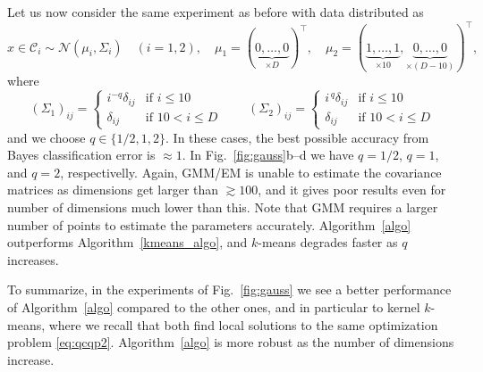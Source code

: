 \documentclass[aps,preprint,nofootinbib,floatfix]{revtex4-1}
\newcommand\C{{\mathcal{C}}}
\begin{document}
Let us now consider the same experiment as before with data distributed as
\begin{equation}
\label{eq:gauss2}
x \in \C_i  \sim 
\mathcal{N}(\mu_i,\Sigma_i) \quad (i=1,2),  \quad
\mu_1 = (\underbrace{0,\dotsc,0}_{\times D})^\top , \quad
\mu_2 = (\underbrace{1,\dots,1}_{\times 10},
\underbrace{0,\dots,0}_{\times (D-10)})^\top, 
\end{equation}
where
\begin{equation}
\label{eq:cov}
(\Sigma_1)_{ij} = \begin{cases}
i^{-q} \delta_{ij} & \mbox{if $i \le 10$} \\
\delta_{ij} & \mbox{if $10 < i \le D$}
\end{cases} \qquad
(\Sigma_2)_{ij} = \begin{cases}
i^{\,q} \delta_{ij} & \mbox{if $i \le 10$} \\
\delta_{ij} & \mbox{if $10 < i \le D$}
\end{cases} 
\end{equation}
and we choose $q \in \{ 1/2, 1, 2\}$. In these cases,
the best possible accuracy from Bayes classification error is $\approx 1$.
In Fig.~\ref{fig:gauss}b--d we have $q=1/2$, $q=1$, and $q=2$, respectivelly.
Again, GMM/EM is unable to estimate the covariance matrices
as dimensions get larger than $\gtrsim 100$, and it gives poor results even
for number of dimensions much lower than this. Note that GMM requires
a larger number of points to estimate the parameters accurately.
Algorithm~\ref{algo} outperforms
Algorithm~\ref{kmeans_algo}, and $k$-means degrades faster as 
$q$ increases.

To summarize, in the experiments of Fig.~\ref{fig:gauss}
we see a better performance of Algorithm~\ref{algo} compared
to the other ones, and in particular to kernel $k$-means,
where we recall that both find local solutions
to the same optimization problem \eqref{eq:qcqp2}.
Algorithm~\ref{algo} is more robust as the number of dimensions
increase.
\end{document}
